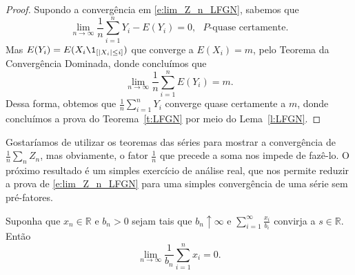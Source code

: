\begin{proof}
  Supondo a convergência em \eqref{e:lim_Z_n_LFGN}, sabemos que
  \begin{equation}
    \lim_{n \to \infty} \frac{1}{n} \sum_{i=1}^n Y_i - E(Y_i) = 0, \text{ $P$-quase certamente.}
  \end{equation}
  Mas $E(Y_i) = E(X_i \1_{[|X_i| \leq i]})$ que converge a $E(X_i) = m$, pelo Teorema da Convergência Dominada, donde concluímos que
  \begin{equation}
    \lim_{n \to \infty} \frac{1}{n} \sum_{i=1}^n E(Y_i) = m.
  \end{equation}
  Dessa forma, obtemos que $\tfrac 1n \sum_{i=1}^n Y_i$ converge quase certamente a $m$, donde concluímos a prova do Teorema~\ref{t:LFGN} por meio do Lema~\ref{l:LFGN}.
\end{proof}

Gostaríamos de utilizar os teoremas das séries para mostrar a convergência de $\tfrac 1n \sum_{n} Z_n$, mas obviamente, o fator $\tfrac 1n$ que precede a soma nos impede de fazê-lo.
O próximo resultado é um simples exercício de análise real, que nos permite reduzir a prova de \eqref{e:lim_Z_n_LFGN} para uma simples convergência de uma série sem pré-fatores.

\begin{lemma}
  Suponha que $x_n \in \mathbb{R}$ e $b_n > 0$ sejam tais que $b_n \uparrow \infty$ e $\sum_{i=1}^\infty \frac{x_i}{b_i}$ convirja a $s \in \mathbb{R}$.
  Então
  \begin{equation}
    \lim_{n \to \infty} \frac{1}{b_n} \sum_{i=1}^n x_i = 0.
  \end{equation}
\end{lemma}

